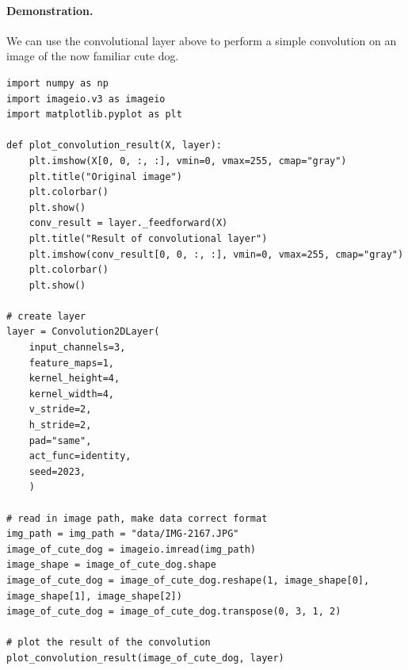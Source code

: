 \documentclass[%
oneside,                 %
final,                   %
10pt]{article}
\begin{document}
\paragraph{Demonstration.}
We can use the convolutional layer above to perform a simple convolution on an image of the now familiar cute dog.







































\begin{verbatim}
import numpy as np
import imageio.v3 as imageio
import matplotlib.pyplot as plt

def plot_convolution_result(X, layer):
    plt.imshow(X[0, 0, :, :], vmin=0, vmax=255, cmap="gray")
    plt.title("Original image")
    plt.colorbar()
    plt.show()
    conv_result = layer._feedforward(X)
    plt.title("Result of convolutional layer")
    plt.imshow(conv_result[0, 0, :, :], vmin=0, vmax=255, cmap="gray")
    plt.colorbar()
    plt.show()

# create layer
layer = Convolution2DLayer(
    input_channels=3,
    feature_maps=1,
    kernel_height=4,
    kernel_width=4,
    v_stride=2,
    h_stride=2,
    pad="same",
    act_func=identity,
    seed=2023,
    )

# read in image path, make data correct format
img_path = img_path = "data/IMG-2167.JPG"
image_of_cute_dog = imageio.imread(img_path)
image_shape = image_of_cute_dog.shape
image_of_cute_dog = image_of_cute_dog.reshape(1, image_shape[0], image_shape[1], image_shape[2])
image_of_cute_dog = image_of_cute_dog.transpose(0, 3, 1, 2)

# plot the result of the convolution
plot_convolution_result(image_of_cute_dog, layer)

\end{verbatim}
\end{document}
